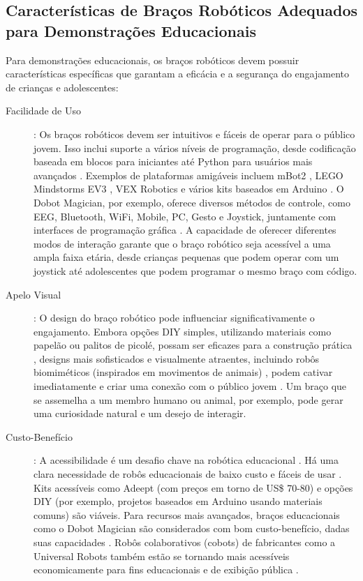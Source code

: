 \documentclass[%
  a4paper,%
  12pt,%
  fleqn,%
  english,%
  brazilian,%
]{article}
\begin{document}
\subsection{Características de Braços Robóticos Adequados para Demonstrações Educacionais}
Para demonstrações educacionais, os braços robóticos devem possuir características específicas que garantam a eficácia e a segurança do engajamento de crianças e adolescentes:
	\begin{description}
		\item [Facilidade de Uso]: Os braços robóticos devem ser intuitivos e fáceis de operar para o público jovem. Isso inclui suporte a vários níveis de programação, desde codificação baseada em blocos para iniciantes até Python para usuários mais avançados \cite{makeblockMBot22025}. Exemplos de plataformas amigáveis incluem mBot2 \cite{makeblockMBot22025}, LEGO Mindstorms EV3 \cite{centrePointRoboticsGames2025}, VEX Robotics \cite{meegleYouthRobotics2025} e vários kits baseados em Arduino \cite{cheung2024SummerLibraries}. O Dobot Magician, por exemplo, oferece diversos métodos de controle, como EEG, Bluetooth, WiFi, Mobile, PC, Gesto e Joystick, juntamente com interfaces de programação gráfica \cite{robotlabDobotClassroomPack2025}. A capacidade de oferecer diferentes modos de interação garante que o braço robótico seja acessível a uma ampla faixa etária, desde crianças pequenas que podem operar com um joystick até adolescentes que podem programar o mesmo braço com código.
		\item [Apelo Visual]: O design do braço robótico pode influenciar significativamente o engajamento. Embora opções DIY simples, utilizando materiais como papelão ou palitos de picolé, possam ser eficazes para a construção prática \cite{scienceBuddiesBuildRoboticArm2025}, designs mais sofisticados e visualmente atraentes, incluindo robôs biomiméticos (inspirados em movimentos de animais) \cite{ross2024BeyondExhibits}, podem cativar imediatamente e criar uma conexão com o público jovem \cite{chang2025ConstructedResponse}. Um braço que se assemelha a um membro humano ou animal, por exemplo, pode gerar uma curiosidade natural e um desejo de interagir.
		\item [Custo-Benefício]: A acessibilidade é um desafio chave na robótica educacional \cite{ross2024BeyondExhibits}. Há uma clara necessidade de robôs educacionais de baixo custo e fáceis de usar \cite{ross2024BeyondExhibits}. Kits acessíveis como Adeept (com preços em torno de US\$ 70-80) \cite{robotshopArmsGrippers2025} e opções DIY (por exemplo, projetos baseados em Arduino usando materiais comuns) \cite{scienceBuddiesBuildRoboticArm2025} são viáveis. Para recursos mais avançados, braços educacionais como o Dobot Magician são considerados com bom custo-benefício, dadas suas capacidades \cite{robotlabDobotClassroomPack2025}. Robôs colaborativos (cobots) de fabricantes como a Universal Robots também estão se tornando mais acessíveis economicamente para fins educacionais e de exibição pública \cite{top3dshopDobotMagicianReview2023}.

\end{description}
\end{document}
